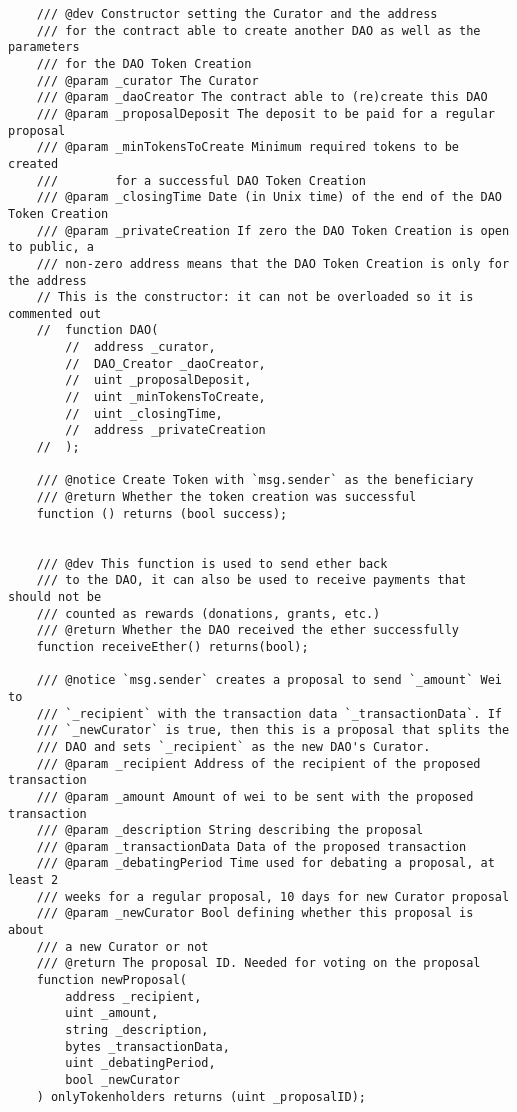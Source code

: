 \documentclass[9pt,oneside]{amsart}
\begin{document}
\begin{appendix}
\begin{verbatim}
    /// @dev Constructor setting the Curator and the address
    /// for the contract able to create another DAO as well as the parameters
    /// for the DAO Token Creation
    /// @param _curator The Curator
    /// @param _daoCreator The contract able to (re)create this DAO
    /// @param _proposalDeposit The deposit to be paid for a regular proposal
    /// @param _minTokensToCreate Minimum required tokens to be created
    ///        for a successful DAO Token Creation
    /// @param _closingTime Date (in Unix time) of the end of the DAO Token Creation
    /// @param _privateCreation If zero the DAO Token Creation is open to public, a
    /// non-zero address means that the DAO Token Creation is only for the address
    // This is the constructor: it can not be overloaded so it is commented out
    //  function DAO(
        //  address _curator,
        //  DAO_Creator _daoCreator,
        //  uint _proposalDeposit,
        //  uint _minTokensToCreate,
        //  uint _closingTime,
        //  address _privateCreation
    //  );

    /// @notice Create Token with `msg.sender` as the beneficiary
    /// @return Whether the token creation was successful
    function () returns (bool success);


    /// @dev This function is used to send ether back
    /// to the DAO, it can also be used to receive payments that should not be
    /// counted as rewards (donations, grants, etc.)
    /// @return Whether the DAO received the ether successfully
    function receiveEther() returns(bool);

    /// @notice `msg.sender` creates a proposal to send `_amount` Wei to
    /// `_recipient` with the transaction data `_transactionData`. If
    /// `_newCurator` is true, then this is a proposal that splits the
    /// DAO and sets `_recipient` as the new DAO's Curator.
    /// @param _recipient Address of the recipient of the proposed transaction
    /// @param _amount Amount of wei to be sent with the proposed transaction
    /// @param _description String describing the proposal
    /// @param _transactionData Data of the proposed transaction
    /// @param _debatingPeriod Time used for debating a proposal, at least 2
    /// weeks for a regular proposal, 10 days for new Curator proposal
    /// @param _newCurator Bool defining whether this proposal is about
    /// a new Curator or not
    /// @return The proposal ID. Needed for voting on the proposal
    function newProposal(
        address _recipient,
        uint _amount,
        string _description,
        bytes _transactionData,
        uint _debatingPeriod,
        bool _newCurator
    ) onlyTokenholders returns (uint _proposalID);


\end{verbatim}
\end{appendix}
\end{document}
